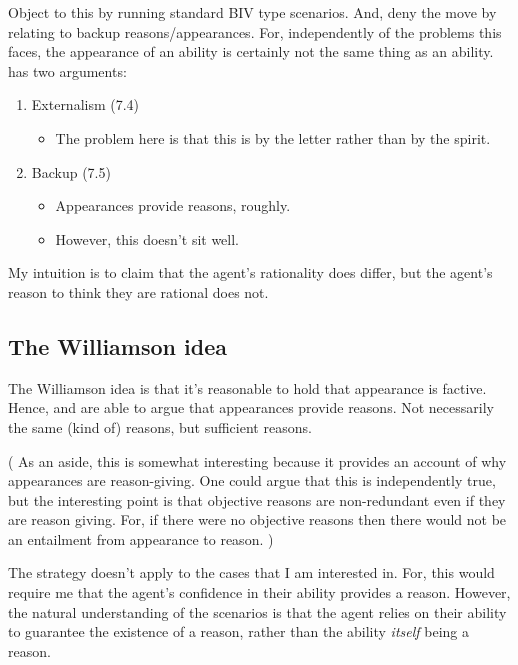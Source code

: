 \documentclass[10pt]{article}
\begin{document}
Object to this by running standard BIV type scenarios.
And, deny the move by \cite{Kiesewetter:2017aa} relating to backup reasons/appearances.
For, independently of the problems this faces, the appearance of an ability is certainly not the same thing as an ability.
\citeauthor{Kiesewetter:2017aa} has two arguments:
\begin{enumerate}
\item Externalism (7.4)
  \begin{itemize}
  \item The problem here is that this is by the letter rather than by the spirit.
  \end{itemize}
\item Backup (7.5)
  \begin{itemize}
  \item Appearances provide reasons, roughly.
  \item However, this doesn't sit well.
  \end{itemize}
\end{enumerate}

My intuition is to claim that the agent's rationality does differ, but the agent's reason to think they are rational does not.


\subsection{The Williamson idea}
\label{sec:williamson-idea}

The Williamson idea is that it's reasonable to hold that appearance is factive.
Hence, \citeauthor[Ch.\ 7]{Lord:2018aa} and \citeauthor{Kiesewetter:2017aa} are able to argue that appearances provide reasons.
Not necessarily the same (kind of) reasons, but sufficient reasons.

(
As an aside, this is somewhat interesting because it provides an account of why appearances are reason-giving.
One could argue that this is independently true, but the interesting point is that objective reasons are non-redundant even if they are reason giving.
For, if there were no objective reasons then there would not be an entailment from appearance to reason.
)

The strategy doesn't apply to the cases that I am interested in.
For, this would require me that the agent's confidence in their ability provides a reason.
However, the natural understanding of the scenarios is that the agent relies on their ability to guarantee the existence of a reason, rather than the ability \emph{itself} being a reason.
\end{document}
